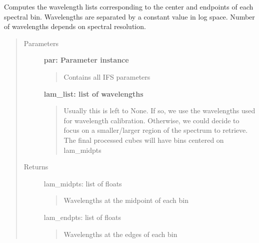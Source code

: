 \documentclass[letterpaper,10pt,english]{sphinxmanual}
\begin{document}
\begin{fulllineitems}
\label{tools:tools.reduction.calculateWaveList}
Computes the wavelength lists corresponding to the center and endpoints of each
spectral bin. Wavelengths are separated by a constant value in log space. Number of
wavelengths depends on spectral resolution.
\begin{quote}\begin{description}
\item[{Parameters}] \leavevmode
\textbf{par:        Parameter instance}
\begin{quote}

Contains all IFS parameters
\end{quote}

\textbf{lam\_list:   list of wavelengths}
\begin{quote}

Usually this is left to None. If so, we use the wavelengths used for wavelength
calibration. Otherwise, we could decide to focus on a smaller/larger region of
the spectrum to retrieve. The final processed cubes will have bins centered
on lam\_midpts
\end{quote}

\item[{Returns}] \leavevmode
lam\_midpts: list of floats
\begin{quote}

Wavelengths at the midpoint of each bin
\end{quote}

lam\_endpts: list of floats
\begin{quote}

Wavelengths at the edges of each bin
\end{quote}

\end{description}\end{quote}

\end{fulllineitems}

\end{document}

